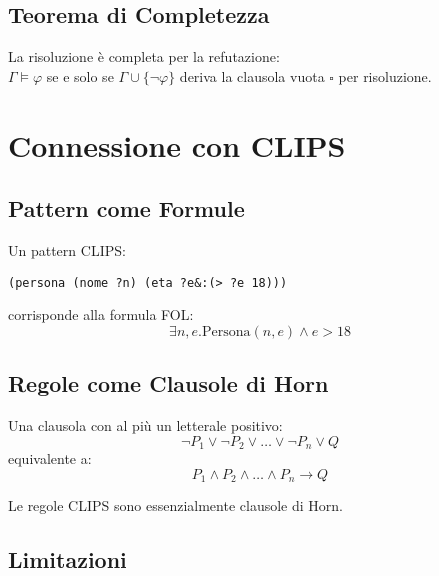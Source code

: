 \subsection{Teorema di Completezza}

\begin{teorema}
La risoluzione è completa per la refutazione: \\
$\Gamma \models \varphi$ se e solo se $\Gamma \cup \{\neg \varphi\}$ deriva la clausola vuota $\square$ per risoluzione.
\end{teorema}

\section{Connessione con CLIPS}

\subsection{Pattern come Formule}

Un pattern CLIPS:
\begin{lstlisting}[language=CLIPS]
(persona (nome ?n) (eta ?e&:(> ?e 18)))
\end{lstlisting}

corrisponde alla formula FOL:
\begin{equation}
\exists n, e. \text{Persona}(n, e) \land e > 18
\end{equation}

\subsection{Regole come Clausole di Horn}

\begin{definizione}
Una clausola con al più un letterale positivo:
\begin{equation}
\neg P_1 \lor \neg P_2 \lor \ldots \lor \neg P_n \lor Q
\end{equation}
equivalente a:
\begin{equation}
P_1 \land P_2 \land \ldots \land P_n \rightarrow Q
\end{equation}
\end{definizione}

Le regole CLIPS sono essenzialmente clausole di Horn.

\subsection{Limitazioni}

